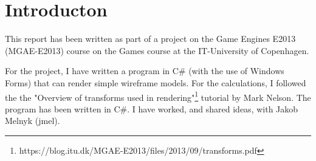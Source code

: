 \section{Introducton}
\label{01}

This report has been written as part of a project on the Game Engines E2013 (MGAE-E2013) course on the Games course at the IT-University of Copenhagen. 

For the project, I have written a program in C\# (with the use of Windows Forms) that can render simple wireframe models. For the calculations, I followed the the "Overview of transforms used in rendering"\footnote{https://blog.itu.dk/MGAE-E2013/files/2013/09/transforms.pdf} tutorial by Mark Nelson. The program has been written in C\#. I have worked, and shared ideas, with Jakob Melnyk (jmel). 
